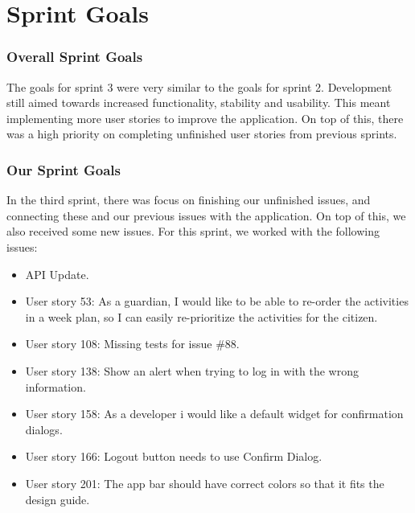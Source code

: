 \section{Sprint Goals}
\label{sect:sprintGoals3}
\subsubsection{Overall Sprint Goals}
The goals for sprint 3 were very similar to the goals for sprint 2. Development still aimed towards increased functionality, stability and usability. This meant implementing more user stories to improve the application. On top of this, there was a high priority on completing unfinished user stories from previous sprints.


\subsubsection{Our Sprint Goals}
In the third sprint, there was focus on finishing our unfinished issues, and connecting these and our previous issues with the application. 
On top of this, we also received some new issues. 
For this sprint, we worked with the following issues:
\begin{itemize}
    \item API Update.
    \item User story 53: As a guardian, I would like to be able to re-order the activities in a week plan, so I can easily re-prioritize the activities for the citizen.
    \item User story 108: Missing tests for issue \#88.
    \item User story 138: Show an alert when trying to log in with the wrong information.
    \item User story 158: As a developer i would like a default widget for confirmation dialogs.
    \item User story 166: Logout button needs to use Confirm Dialog.
    \item User story 201: The app bar should have correct colors so that it fits the design guide.
    
\end{itemize}




